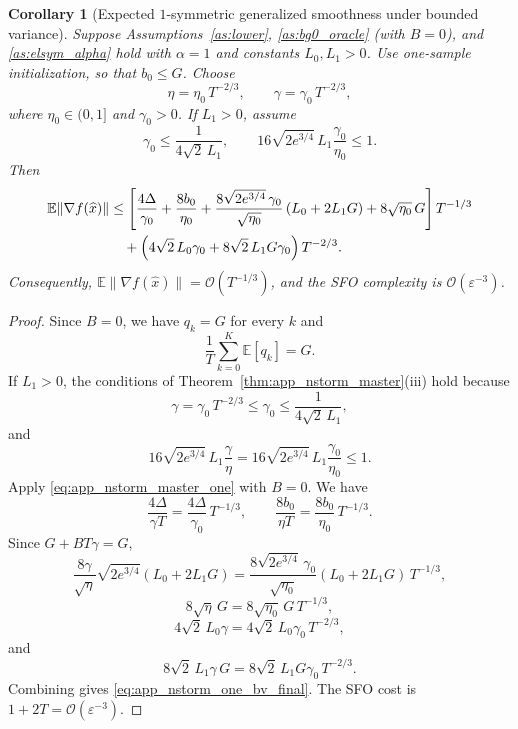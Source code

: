 \documentclass[letter,11pt]{article}
\newtheorem{corollary}{Corollary}[theorem]
\newcommand{\E}{\mathbb{E}}
\newcommand{\Ocal}{\mathcal{O}}
\begin{document}
\begin{corollary}[Expected $1$-symmetric generalized smoothness under bounded variance]
\label{cor:app_nstorm_one_bv}
Suppose Assumptions~\ref{as:lower}, \ref{as:bg0_oracle} (with $B=0$), and
\ref{as:elsym_alpha} hold with $\alpha=1$ and constants $L_0,L_1>0$. Use
one-sample initialization, so that $b_0\le G$. Choose
\[
    \eta = \eta_0\,T^{-2/3},
    \qquad
    \gamma = \gamma_0\,T^{-2/3},
\]
where $\eta_0\in(0,1]$ and $\gamma_0>0$. If $L_1>0$, assume
\[
    \gamma_0\le\frac{1}{4\sqrt{2}\,L_1},
    \qquad
    16\sqrt{2e^{3/4}}\,L_1\frac{\gamma_0}{\eta_0}\le1.
\]
Then
\begin{align}
    \E\|\nabla f(\widehat x)\|
    &\le
    \left[
        \frac{4\Delta}{\gamma_0}
        + \frac{8b_0}{\eta_0}
        + \frac{8\sqrt{2e^{3/4}}\,\gamma_0}{\sqrt{\eta_0}}
        \left(L_0+2L_1 G\right)
        + 8\sqrt{\eta_0}\,G
    \right] T^{-1/3}
    \notag\\
    &\quad
    + \left(
        4\sqrt{2}\,L_0\gamma_0
        + 8\sqrt{2}\,L_1 G\gamma_0
    \right) T^{-2/3}.
    \label{eq:app_nstorm_one_bv_final}
\end{align}
Consequently,
$\E\|\nabla f(\widehat x)\| = \Ocal(T^{-1/3})$,
and the SFO complexity is $\Ocal(\varepsilon^{-3})$.
\end{corollary}

\begin{proof}
Since $B=0$, we have $q_k=G$ for every $k$ and
\[
    \frac{1}{T}\sum_{k=0}^{K}\E[q_k] = G.
\]
If $L_1>0$, the conditions of Theorem~\ref{thm:app_nstorm_master}(iii) hold
because
\[
    \gamma = \gamma_0\,T^{-2/3} \le \gamma_0 \le \frac{1}{4\sqrt{2}\,L_1},
\]
and
\[
    16\sqrt{2e^{3/4}}\,L_1\frac{\gamma}{\eta}
    = 16\sqrt{2e^{3/4}}\,L_1\frac{\gamma_0}{\eta_0}
    \le 1.
\]
Apply \eqref{eq:app_nstorm_master_one} with $B=0$. We have
\[
    \frac{4\Delta}{\gamma T}
    = \frac{4\Delta}{\gamma_0}\,T^{-1/3},
    \qquad
    \frac{8b_0}{\eta T}
    = \frac{8b_0}{\eta_0}\,T^{-1/3}.
\]
Since $G+BT\gamma=G$,
\[
    \frac{8\gamma}{\sqrt{\eta}}\sqrt{2e^{3/4}}
    \left(L_0+2L_1 G\right)
    = \frac{8\sqrt{2e^{3/4}}\,\gamma_0}{\sqrt{\eta_0}}
    (L_0+2L_1 G)\,T^{-1/3},
\]
\[
    8\sqrt{\eta}\,G
    = 8\sqrt{\eta_0}\,G\,T^{-1/3},
\]
\[
    4\sqrt{2}\,L_0\gamma
    = 4\sqrt{2}\,L_0\gamma_0\,T^{-2/3},
\]
and
\[
    8\sqrt{2}\,L_1\gamma\,G
    = 8\sqrt{2}\,L_1 G\gamma_0\,T^{-2/3}.
\]
Combining gives \eqref{eq:app_nstorm_one_bv_final}. The SFO cost is
$1+2T=\Ocal(\varepsilon^{-3})$.
\end{proof}
\end{document}
